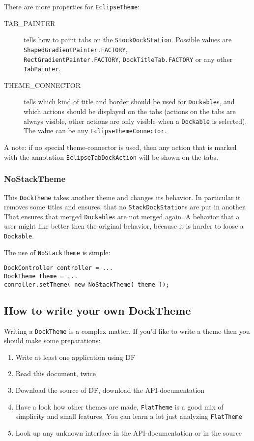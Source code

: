 \documentclass[a4paper,10pt]{article}
\newcommand{\src}[1]{\lstinline[basicstyle=\normalsize\ttfamily,keywordstyle=\normalsize\ttfamily,identifierstyle=\normalsize\ttfamily]|#1|}
\begin{document}
There are more properties for \src{EclipseTheme}:
\begin{description}
 \item[TAB\_PAINTER] tells how to paint tabs on the \src{StockDockStation}. Possible values are \src{ShapedGradientPainter.FACTORY}, \\\src{RectGradientPainter.FACTORY}, \src{DockTitleTab.FACTORY} or any other \\\src{TabPainter}.
 \item[THEME\_CONNECTOR] tells which kind of title and border should be used for \src{Dockable}s, and which actions should be displayed on the tabs (actions on the tabs are always visible, other actions are only visible when a \src{Dockable} is selected). The value can be any \src{EclipseThemeConnector}.
 \end{description}

A note: if no special theme-connector is used, then any action that is marked with the annotation \src{EclipseTabDockAction} will be shown on the tabs.

\subsubsection{NoStackTheme}
This \src{DockTheme} takes another theme and changes its behavior. In particular it removes some titles and ensures, that no \src{StackDockStation}s are put in another. That ensures that merged \src{Dockable}s are not merged again. A behavior that a user might like better then the original behavior, because it is harder to loose a \src{Dockable}.

The use of \src{NoStackTheme} is simple:
\begin{lstlisting}
DockController controller = ...
DockTheme theme = ...
conroller.setTheme( new NoStackTheme( theme ));
\end{lstlisting}

\subsection{How to write your own DockTheme}
Writing a \src{DockTheme} is a complex matter. If you'd like to write a theme then you should make some preparations:
\begin{enumerate}
 \item Write at least one application using DF
 \item Read this document, twice
 \item Download the source of DF, download the API-documentation
 \item Have a look how other themes are made, \src{FlatTheme} is a good mix of simplicity and small features. You can learn a lot just analyzing \src{FlatTheme}
 \item Look up any unknown interface in the API-documentation or in the source
\end{enumerate}
\end{document}
